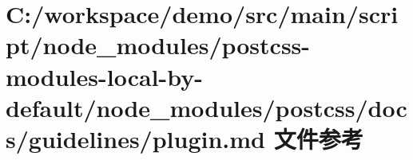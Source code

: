 \hypertarget{postcss-modules-local-by-default_2node__modules_2postcss_2docs_2guidelines_2plugin_8md}{}\section{C\+:/workspace/demo/src/main/script/node\+\_\+modules/postcss-\/modules-\/local-\/by-\/default/node\+\_\+modules/postcss/docs/guidelines/plugin.md 文件参考}
\label{postcss-modules-local-by-default_2node__modules_2postcss_2docs_2guidelines_2plugin_8md}
